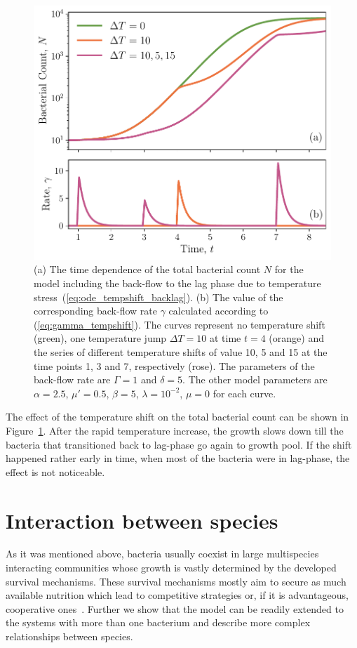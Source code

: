 \documentclass[10pt,A4paper]{article}
\numberwithin{equation}{section}
\begin{document}
\begin{figure}[t]
    \begin{center}
    \includegraphics[width=0.9\columnwidth]{Figures/pool_model_3pools_resource_tempshift.pdf}
    \caption{
        (a) The time dependence of the total bacterial count $N$ for the model including the back-flow to the lag phase due to temperature stress~(\ref{eq:ode_tempshift_backlag}).
        (b) The value of the corresponding back-flow rate $\gamma$ calculated according to (\ref{eq:gamma_tempshift}).
        The curves represent no temperature shift (green), one temperature jump $\Delta T = 10$ at time $t=4$ (orange)
        and the series of different temperature shifts of value 10, 5 and 15 at the time points 1, 3 and 7, respectively (rose).
        The parameters of the back-flow rate are $\Gamma=1$ and $\delta=5$.
        The other model parameters are $\alpha=2.5$, $\mu'=0.5$, $\beta=5$, $\lambda=10^{-2}$, $\mu = 0$ for each curve.
    }
    \label{fig:TempJump}
    \end{center}
\end{figure}
The effect of the temperature shift on the total bacterial count can be shown in Figure~\ref{fig:TempJump}.
After the rapid temperature increase, the growth slows down till the bacteria that transitioned back to lag-phase go again to growth pool.
If the shift happened rather early in time, when most of the bacteria were in lag-phase, the effect is not noticeable.
%
\section{Interaction between species}
As it was mentioned above, bacteria usually coexist in large multispecies interacting communities whose growth is vastly determined by the developed survival mechanisms.
These survival mechanisms mostly aim to secure as much available nutrition which lead to competitive strategies or, if it is advantageous, cooperative ones~\cite{hibbing_bacterial_2010, stubbendieck_bacterial_2016}.
Further we show that the model can be readily extended to the systems with more than one bacterium and describe more complex relationships between species. 
%
\end{document}
